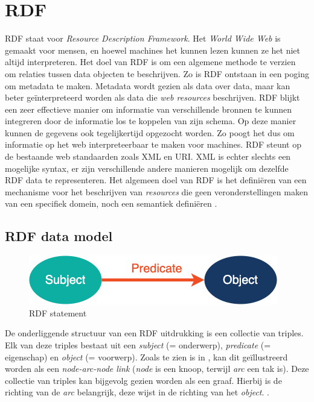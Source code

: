 \section{RDF}
\label{sec:rdf}

RDF staat voor \textit{Resource Description Framework}. Het \textit{World Wide Web} is gemaakt voor mensen, en hoewel machines het kunnen lezen kunnen ze het niet altijd interpreteren. Het doel van RDF is om een algemene methode te verzien om relaties tussen data objecten te beschrijven. Zo is RDF ontstaan in een poging om metadata te maken. Metadata wordt gezien als data over data, maar kan beter geïnterpreteerd worden als data die \textit{web resources} beschrijven. RDF blijkt een zeer effectieve manier om informatie van verschillende bronnen te kunnen integreren door de informatie los te koppelen van zijn schema. Op deze manier kunnen de gegevens ook tegelijkertijd opgezocht worden. Zo poogt het dus om informatie op het web interpreteerbaar te maken voor machines. RDF steunt op de bestaande web standaarden zoals XML en URI. XML is echter slechts een mogelijke syntax, er zijn verschillende andere manieren mogelijk om dezelfde RDF data te representeren. Het algemeen doel van RDF is het definiëren van een mechanisme voor het beschrijven van \textit{resources} die geen veronderstellingen maken van een specifiek domein, noch een semantiek definiëren \cite{lassila1998resource}.




\subsection{RDF data model}
\begin{figure}
    \centering
    \includegraphics[width=0.5\linewidth]{images/spo.png}
    \caption{RDF statement}
    \label{fig:spo}
\end{figure}

De onderliggende structuur van een RDF uitdrukking is een collectie van triples. Elk van deze triples bestaat uit een \textit{subject} (= onderwerp), \textit{predicate} (= eigenschap) en \textit{object} (= voorwerp). Zoals te zien is in , kan dit geïllustreerd worden als een \textit{node-arc-node link} (\textit{node} is een knoop, terwijl \textit{arc} een tak is). Deze collectie van triples kan bijgevolg gezien worden als een graaf. Hierbij is de richting van de \textit{arc} belangrijk, deze wijst in de richting van het \textit{object}. \cite{klyne2009resource}.

